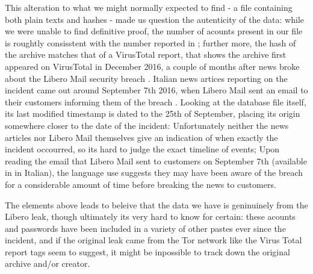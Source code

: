 This alteration to what we might normally expected to find - a file containing both plain texts and hashes - made us question the autenticity of the data: while we were unable to find definitive proof, the number of acounts present in our file is roughtly consisstent with the number reported in \cite{libero_leak}; further more, the hash of the archive matches that of a VirusTotal report, that shows the archive first appeared on VirusTotal in December 2016, a couple of months after news broke about the Libero Mail security breach \cite{virus_total}.
Italian news artices reporting on the incident came out around September  7th 2016, when Libero Mail sent an email to their customers informing them of the breach \cite{libero-news-wired,libero-news-tomhw,libero-news-fanpage}.
Looking at the database file itself, its last modified timestamp is dated to the 25th of September, placing its origin somewhere closer to the date of the incident: Unfortunately neither the news articles nor Libero Mail themselves give an indication of when exactly the incident occourred, so its hard to judge the exact timeline of events; Upon reading the email that Libero Mail sent to customers on September 7th (available in \cite{libero-news-fanpage} in Italian), the language use suggests they may have been aware of the breach for a considerable amount of time before breaking the news to customers.

The elements above leads to beleive that the data we have is geninuinely from the Libero leak, though ultimately its very hard to know for certain: these acounts and passwords have been included in a variety of other pastes ever since the incident, and if the original leak came from the Tor network like the Virus Total report tags seem to suggest, it might be inpossible to track down the original archive and/or creator.

   


